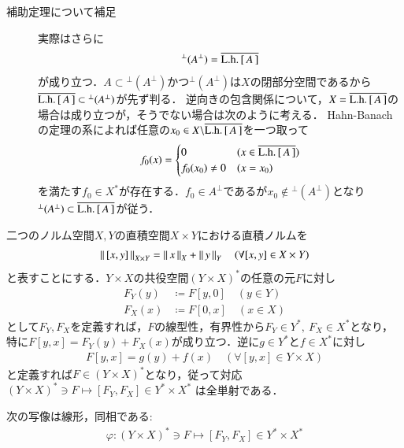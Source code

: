 	\begin{description}
		\item[補助定理について補足]
			実際はさらに
			\begin{align}
				{}^{\perp}(A^{\perp}) = \overline{\mathrm{L.h.}\left[\, A\, \right]}
			\end{align}
			が成り立つ．$A \subset {}^{\perp}(A^{\perp})$かつ${}^{\perp}(A^{\perp})$は$X$の閉部分空間であるから
			$\overline{\mathrm{L.h.}\left[\, A\, \right]} \subset {}^{\perp}(A^{\perp})$が先ず判る．
			逆向きの包含関係について，$X = \overline{\mathrm{L.h.}\left[\, A\, \right]}$の場合は成り立つが，そうでない場合は次のように考える．
			Hahn-Banachの定理の系によれば任意の$x_0 \in X \backslash \overline{\mathrm{L.h.}\left[\, A\, \right]}$を一つ取って
			\begin{align}
				f_0(x) = 
				\begin{cases}
					0 & (x \in \overline{\mathrm{L.h.}\left[\, A\, \right]}) \\
					f_0(x_0) \neq 0 & (x = x_0)
				\end{cases}
			\end{align}
			を満たす$f_0 \in X^*$が存在する．$f_0 \in A^{\perp}$であるが$x_0 \notin {}^{\perp}(A^{\perp})$となり
			${}^{\perp}(A^{\perp}) \subset \overline{\mathrm{L.h.}\left[\, A\, \right]}$が従う．
			\QED
	\end{description}
	
	二つのノルム空間$X,Y$の直積空間$X \times Y$における直積ノルムを
	\begin{align}
		\left\|\, [x,y]\, \right\|_{X \times Y} = \left\|\, x\, \right\|_{X} + \left\|\, y\, \right\|_{Y} \quad (\forall [x,y] \in X \times Y)
	\end{align}
	と表すことにする．$Y \times X$の共役空間$(Y \times X)^*$の任意の元$F$に対し
	\begin{align}
		F_Y(y) &\coloneqq F[y,0] \quad (y \in Y) \\
		F_X(x) &\coloneqq F[0,x] \quad (x \in X) \label{eq:thm_T_star_closed_1}
	\end{align}
	として$F_Y, F_X$を定義すれば，$F$の線型性，有界性から$F_Y \in Y^*,\ F_X \in X^*$となり，
	特に$F[y,x] = F_Y(y) + F_X(x)$が成り立つ．逆に$g \in Y^*$と$f \in X^*$に対し
	\begin{align}
		F[y,x] = g(y) + f(x) \quad (\forall [y,x] \in Y \times X)
	\end{align}
	と定義すれば$F \in (Y \times X)^*$となり，従って対応$(Y \times X)^* \ni F \longmapsto [F_Y,F_X] \in Y^* \times X^*$
	は全単射である．
	\begin{screen}
		\begin{lem}
			次の写像は線形，同相である:
			\begin{align}
				\varphi : (Y \times X)^* \ni F \longmapsto [F_Y,F_X] \in Y^* \times X^*
			\end{align}
			\label{lem:T_star_closed_2}
		\end{lem}
	\end{screen}
	
